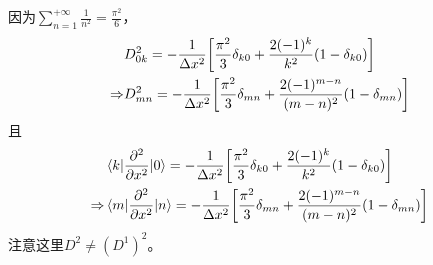 \documentclass[UTF8,12pt]{article}
\begin{document}
        因为$\sum\limits_{n=1}^{+\infty}{\frac{1}{n^2}}=\frac{\pi^2}{6}$，
        \begin{align}
            &D^2_{0k}=-\frac{1}{\Delta x^2}\qty[\frac{\pi^2}{3}\delta_{k0}+\frac{2(-1)^k}{k^2}(1-\delta_{k0})] \\
            \Rightarrow&D^2_{mn}=-\frac{1}{\Delta x^2}\qty[\frac{\pi^2}{3}\delta_{mn}+\frac{2(-1)^{m-n}}{(m-n)^2}(1-\delta_{mn})]
        \end{align}
        且
        \begin{align}
            &\mel{k}{\pdv[2]{x}}{0}=-\frac{1}{\Delta x^2}\qty[\frac{\pi^2}{3}\delta_{k0}+\frac{2(-1)^k}{k^2}(1-\delta_{k0})] \\
            \Rightarrow&\mel{m}{\pdv[2]{x}}{n}=-\frac{1}{\Delta x^2}\qty[\frac{\pi^2}{3}\delta_{mn}+\frac{2(-1)^{m-n}}{(m-n)^2}(1-\delta_{mn})]
        \end{align}
        注意这里$D^2\neq(D^1)^2$。
\end{document}
